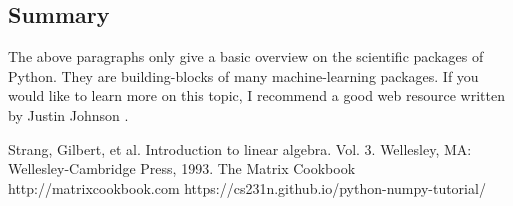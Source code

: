 \documentclass[10pt]{article}
\begin{document}
\subsection{Summary}
The above paragraphs only give a basic overview on the scientific packages of Python.
They are building-blocks of many machine-learning packages.
If you would like to learn more on this topic, I recommend a
good web resource written by Justin Johnson \cite{numpy}.

\begin{thebibliography}{9}
 Strang, Gilbert, et al. Introduction to linear algebra. Vol. 3. Wellesley, MA: Wellesley-Cambridge Press, 1993.
 The Matrix Cookbook  http://matrixcookbook.com 
 https://cs231n.github.io/python-numpy-tutorial/

\end{thebibliography}
\end{document}
